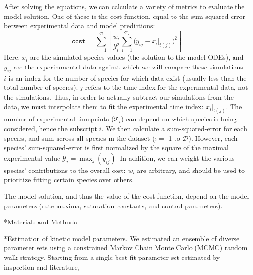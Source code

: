 \documentclass[12pt]{article}
\makeatletter
\renewcommand\subsection{\@startsection
	{subsection}{2}{0mm}
	{-0.05in}
	{-0.5\baselineskip}
	{\normalfont\normalsize\bfseries}}
\renewcommand\section{\@startsection
	{subsection}{2}{0mm}
	{-0.2in}
	{0.05\baselineskip}
	{\normalfont\large\bfseries}}
\makeatother
\begin{document}
After solving the equations, we can calculate a variety of metrics to evaluate the model solution.
One of these is the cost function, equal to the sum-squared-error between experimental data and model predictions:
\begin{equation}\label{eqn:cost-function}
    \texttt{cost}=\sum_{i=1}^{\mathcal{D}}\left[\frac{w_i}{\mathcal{Y}_{i}^2}\sum_{j=1}^{\mathcal{T}_i}\bigg(y_{ij}-x_{i}|_{t(j)}\bigg)^2 \right]
\end{equation}
Here, $x_{i}$ are the simulated species values (the solution to the model ODEs), and $y_{ij}$ are the experimmental data against which we will compare these simulations.
$i$ is an index for the number of species for which data exist (usually less than the total number of species).
$j$ refers to the time index for the experimental data, not the simulations.
Thus, in order to actually subtract our simulations from the data, we must interpolate them to fit the experimental time index: $x_{i}|_{t(j)}$.
The number of experimental timepoints ($\mathcal{T}_i$) can depend on which species is being considered, hence the subscript $i$.
We then calculate a sum-squared-error for each species, and sum across all species in the dataset ($i =$ 1 to $\mathcal{D}$).
However, each species' sum-squared-error is first normalized by the square of the maximal experimental value $\mathcal{Y}_{i}=\max_{j}\left(y_{ij}\right)$.
In addition, we can weight the various species' contributions to the overall cost: $w_i$ are arbitrary, and should be used to prioritize fitting certain species over others.

The model solution, and thus the value of the cost function, depend on the model parameters (rate maxima, saturation constants, and control parameters).

\clearpage

\section*{Materials and Methods}

\subsection*{Estimation of kinetic model parameters.}
We estimated an ensemble of diverse parameter sets using a constrained Markov Chain Monte Carlo (MCMC) random walk strategy.
Starting from a single best-fit parameter set estimated by inspection and literature,
\end{document}
